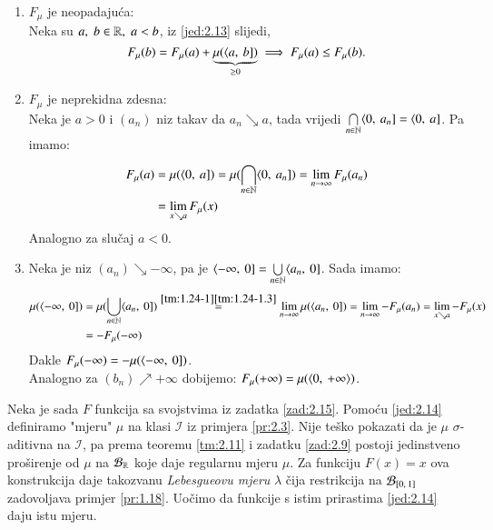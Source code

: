 \begin{rj}[\ref{zad:2.15}]  \label{rj:2.15}
    \quad
    \begin{enumerate}[label=\arabic*.]
        \item $F_{\mu}$ je neopadaju\' ca:\\
        Neka su $a, \; b \in \mathbb{R}, \; a < b$, iz \eqref{jed:2.13} slijedi,
        \begin{equation*}
            F_\mu (b) = F_\mu (a) + \underbrace{\mu (\langle {a}, \: {b}])}_{\geq 0} \implies F_\mu (a) \leq F_\mu (b).
        \end{equation*}
        \item $F_\mu$ je neprekidna zdesna:\\
        Neka je $a > 0$ i $(a_n)$ niz takav da $a_n \searrow a$, tada vrijedi $\bigcap\limits_{n \in \mathbb{N}}^{} \langle {0}, \: {a_n}] = \langle {0}, \: {a}]$.
        Pa imamo:
        \begin{equation*}
            \begin{aligned}
                F_\mu (a) &= \mu(\langle {0}, \: {a}]) = \mu (\bigcap\limits_{n \in \mathbb{N}}^{} \langle {0}, \: {a_n}]) = \lim\limits_{n \to \infty} F_\mu (a_n)\\
                &= \lim_{x \searrow a} F_\mu (x)
            \end{aligned}
        \end{equation*}
        Analogno za slu\v caj $a < 0$.
        \item Neka je niz $(a_n) \searrow -\infty$, pa je $\langle {-\infty}, \: {0}] = \bigcup\limits_{n \in \mathbb{N}}^{} \langle {a_n}, \: {0}]$.
        Sada imamo:
        \begin{equation*}
            \begin{aligned}
                \mu (\langle {-\infty}, \: {0}]) &= \mu (\bigcup\limits_{n \in \mathbb{N}}^{} \langle {a_n}, \: {0}]) \overset{\ref{tm:1.24-1} \ref{tm:1.24-1.3}}{=} \lim\limits_{n \to \infty} \mu({\langle {a_n}, \: {0}]}) = \lim\limits_{n \to \infty} - F_\mu (a_n) = \lim\limits_{x \searrow a} - F_\mu (x)\\
                &= - F_\mu (-\infty)
            \end{aligned}
        \end{equation*}
        Dakle $F_\mu (-\infty) = - \mu (\langle {-\infty}, \: {0}])$.\\
        Analogno za $(b_n) \nearrow +\infty$ dobijemo:
        $F_\mu (+\infty) = \mu (\langle {0}, \: {+\infty} \rangle)$.
    \end{enumerate}
\end{rj}

Neka je sada $F$ funkcija sa svojstvima iz zadatka \ref{zad:2.15}.
Pomo\' cu \eqref{jed:2.14} definiramo "mjeru" $\mu$ na klasi $\mathcal{I}$ iz primjera \eqref{pr:2.3}.
Nije te\v sko pokazati da je $\mu$ $\sigma$-aditivna na $\mathcal{I}$, pa prema teoremu \ref{tm:2.11} i zadatku \ref{zad:2.9} postoji jedinstveno pro\v sirenje od $\mu$ na $\mathcal{B}_{\mathbb{R}}$ koje daje regularnu mjeru $\mu$.
Za funkciju $F(x) = x$ ova konstrukcija daje takozvanu \emph{Lebesgueovu mjeru} $\lambda$ \v cija restrikcija na $\mathcal{B}_{[{0}, \:{1}]}$ zadovoljava primjer \ref{pr:1.18}.
Uo\v cimo da funkcije s istim prirastima \eqref{jed:2.14} daju istu mjeru.